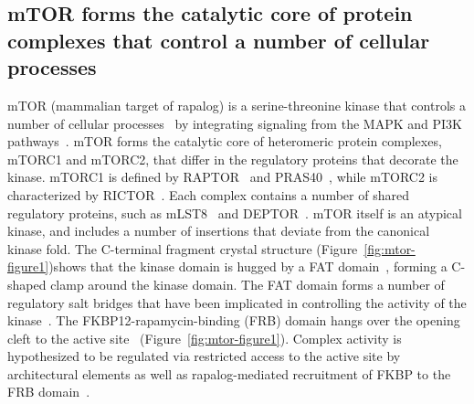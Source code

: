 \documentclass[phd,tocprelim]{cornell}
\begin{document}
\subsection{mTOR forms the catalytic core of protein complexes that control a number of cellular processes}
mTOR (mammalian target of rapalog) is a serine-threonine kinase that controls a number of cellular processes~\citep{Laplante:2012fm,Saxton:2017cv} by integrating signaling from the MAPK and PI3K pathways~\citep{Mendoza2011-bj}. mTOR forms the catalytic core of heteromeric protein complexes, mTORC1 and mTORC2, that differ in the regulatory proteins that decorate the kinase. mTORC1 is defined by RAPTOR~\citep{Kim:2002vh,Hara:2002tn} and PRAS40~\citep{Yang:2017gu}, while mTORC2 is characterized by RICTOR~\citep{Sarbassov:2004kv}. Each complex contains a number of shared regulatory proteins, such as mLST8~\cite{BarPeled:2012gq} and DEPTOR~\citep{Peterson:2009fc}. mTOR itself is an atypical kinase, and includes a number of insertions that deviate from the canonical kinase fold. The C-terminal fragment crystal structure (Figure~\ref{fig:mtor-figure1})shows that the kinase domain is hugged by a FAT domain~\citep{Yang:2013gaa}, forming a C-shaped clamp around the kinase domain. The FAT domain forms a number of regulatory salt bridges that have been implicated in controlling the activity of the kinase~\cite{Yang:2013gaa}. The FKBP12-rapamycin-binding (FRB) domain hangs over the opening cleft to the active site~\cite{Yang:2013gaa} (Figure~\ref{fig:mtor-figure1}). Complex activity is hypothesized to be regulated via restricted access to the active site by architectural elements as well as rapalog-mediated recruitment of FKBP to the FRB domain~\citep{Aylett:2016gs}. 
\end{document}
